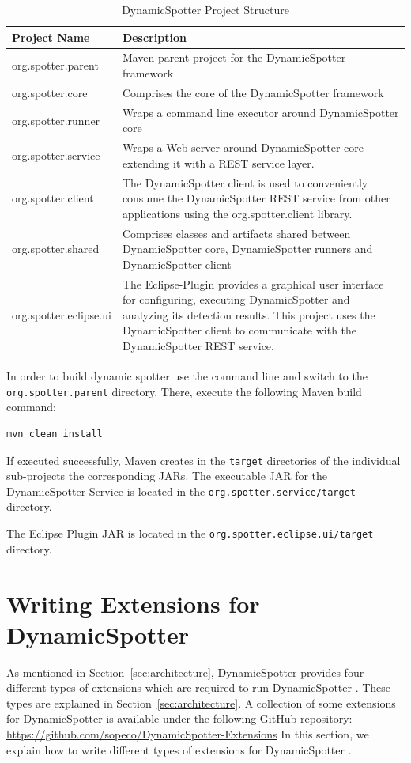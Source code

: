 \documentclass{report}
\newcommand{\DS}{DynamicSpotter }
\newcommand{\link}[1]{\textcolor[rgb]{0.0,0.0,1.0}{\href{#1}{#1}}}
\begin{document}
\begin{table}[h]
\centering
\begin{tabular}{p{}p{}}
\toprule
 \textbf{Project Name} & \textbf{Description}\\
\midrule
org.spotter.parent & Maven parent project for the \DS framework\\
\midrule
org.spotter.core & Comprises the core of the \DS framework\\
\midrule
org.spotter.runner & Wraps a command line executor around \DS core\\
\midrule
org.spotter.service & Wraps a Web server around \DS core extending it with a REST service layer.\\
\midrule
org.spotter.client & The \DS client is used to conveniently consume the \DS REST service from other applications using
the org.spotter.client library.\\
\midrule
org.spotter.shared & Comprises classes and artifacts shared between \DS core, \DS runners and \DS client\\
\midrule
org.spotter.eclipse.ui & The Eclipse-Plugin provides a graphical user interface for configuring, executing \DS and
analyzing its detection results. This project uses the \DS client to communicate with the \DS REST service.\\
\bottomrule
\end{tabular}
\caption{\DS Project Structure}
\label{tab:projects}
\end{table}

In order to build dynamic spotter use the command line and switch to the \texttt{org.spotter.parent} directory. There,
execute the following Maven build command:
\begin{lstlisting}[language=sh,morekeywords={java,javaagent,port, rootDir}, frame=single]
mvn clean install
\end{lstlisting}
If executed successfully, Maven creates in the \texttt{target} directories of the individual sub-projects the
corresponding JARs. The executable JAR for the \DS Service is located in the \texttt{org.spotter.service/target}
directory. 

The Eclipse Plugin JAR is located in the \texttt{org.spotter.eclipse.ui/target} directory.

\section{Writing Extensions for \DS}
\label{sec:extensions}
As mentioned in Section~\ref{sec:architecture}, \DS provides four different types of extensions which are required to
run \DS. These types are explained in Section~\ref{sec:architecture}. A collection of some extensions for \DS is
available under the following GitHub repository:
\newline
\newline
\link{https://github.com/sopeco/DynamicSpotter-Extensions}
\newline
\newline
In this section, we explain how to write different types of extensions for \DS.
\end{document}
